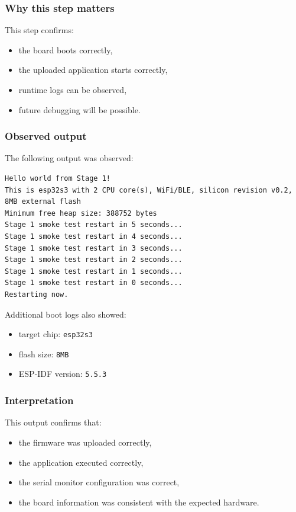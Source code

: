 \documentclass[12pt,a4paper]{article}
\begin{document}
\subsubsection*{Why this step matters}

This step confirms:

\begin{itemize}
    \item the board boots correctly,
    \item the uploaded application starts correctly,
    \item runtime logs can be observed,
    \item future debugging will be possible.
\end{itemize}

\subsubsection*{Observed output}

The following output was observed:

\begin{lstlisting}
Hello world from Stage 1!
This is esp32s3 with 2 CPU core(s), WiFi/BLE, silicon revision v0.2,
8MB external flash
Minimum free heap size: 388752 bytes
Stage 1 smoke test restart in 5 seconds...
Stage 1 smoke test restart in 4 seconds...
Stage 1 smoke test restart in 3 seconds...
Stage 1 smoke test restart in 2 seconds...
Stage 1 smoke test restart in 1 seconds...
Stage 1 smoke test restart in 0 seconds...
Restarting now.
\end{lstlisting}

Additional boot logs also showed:

\begin{itemize}
    \item target chip: \texttt{esp32s3}
    \item flash size: \texttt{8MB}
    \item ESP-IDF version: \texttt{5.5.3}
\end{itemize}

\subsubsection*{Interpretation}

This output confirms that:

\begin{itemize}
    \item the firmware was uploaded correctly,
    \item the application executed correctly,
    \item the serial monitor configuration was correct,
    \item the board information was consistent with the expected hardware.
\end{itemize}
\end{document}
